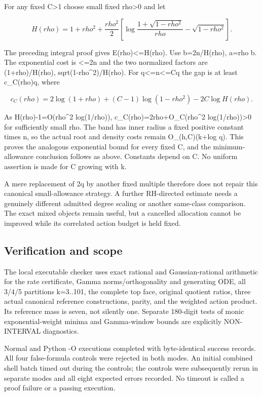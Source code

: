 \documentclass[11pt,a4paper]{article}
\begin{document}
For any fixed C\textgreater1 choose small fixed rho\textgreater0 and let

\[
H(rho)=1+rho^2+\frac{rho^2}{2}
\left[\log\frac{1+\sqrt{1-rho^2}}{rho}-\sqrt{1-rho^2}\right].
\tag{ECT31}\label{ECT:eq-31}\]

The preceding integral proof gives E(rho)\textless=H(rho). Use b=2n/H(rho), a=rho b. The exponential cost is \textless=2n and the two normalized factors are (1+rho)/H(rho), sqrt(1-rho\^{}2)/H(rho). For q\textless=n\textless=Cq the gap is at least c\_C(rho)q, where

\[
c_C(rho)=2\log(1+rho)+(C-1)\log(1-rho^2)-2C\log H(rho).
\tag{ECT32}\label{ECT:eq-32}\]

As H(rho)-1=O(rho\^{}2 log(1/rho)), c\_C(rho)=2rho+O\_C(rho\^{}2 log(1/rho))\textgreater0 for sufficiently small rho. The band has inner radius a fixed positive constant times n, so the actual root and density costs remain O\_(h,C)(k+log q). This proves the analogous exponential bound for every fixed C, and the minimum-allowance conclusion follows as above. Constants depend on C. No uniform assertion is made for C growing with k.

A mere replacement of 2q by another fixed multiple therefore does not repair this canonical small-allowance strategy. A further RH-directed estimate needs a genuinely different admitted degree scaling or another same-class comparison. The exact mixed objects remain useful, but a cancelled allocation cannot be improved while its correlated action budget is held fixed.

\subsection{Verification and scope}\label{ECT:verification-and-scope}

The local executable checker uses exact rational and Gaussian-rational arithmetic for the rate certificate, Gamma norms/orthogonality and generating ODE, all 3/4/5 partitions k=3..101, the complete top face, original quotient ratios, three actual canonical reference constructions, parity, and the weighted action product. Its reference mass is seven, not silently one. Separate 180-digit tests of monic exponential-weight minima and Gamma-window bounds are explicitly NON-INTERVAL diagnostics.

Normal and Python -O executions completed with byte-identical success records. All four false-formula controls were rejected in both modes. An initial combined shell batch timed out during the controls; the controls were subsequently rerun in separate modes and all eight expected errors recorded. No timeout is called a proof failure or a passing execution.
\end{document}
